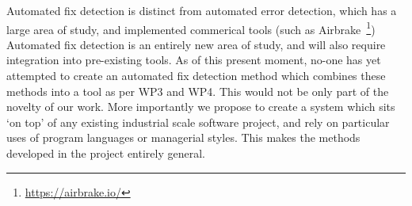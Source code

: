 Automated fix detection is distinct from automated error detection, which has a large area of study, and implemented commerical tools (such as Airbrake~\footnote{\url{https://airbrake.io/}}) Automated fix detection is an entirely new area of study, and will also require integration into pre-existing tools. As of this present moment, no-one has yet attempted to create
an automated fix detection method which combines these methods into a tool as per WP3 and WP4. This would not be
only part of the novelty of our work. More importantly we propose to create a system which sits `on
top' of any existing industrial scale software project, and rely on particular uses of program languages or managerial styles. This makes the methods developed in the project entirely general. 

